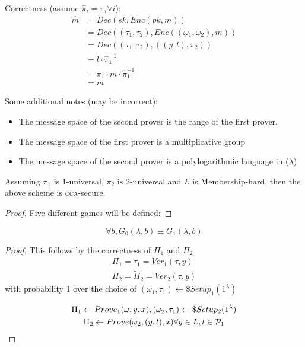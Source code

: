 Correctness (assume $\hat{\pi}_i = \pi_i \forall i$):
\begin{align*}
    \hat{m} &= Dec(sk, Enc(pk, m)) \\
    &= Dec((\tau_1, \tau_2), Enc((\omega_1, \omega_2), m)) \\
    &= Dec((\tau_1, \tau_2), ((y, l), \pi_2)) \\
    &= l \cdot \hat{\pi}_1^{-1} \\
    &= \pi_1 \cdot m \cdot \hat{\pi}_1^{-1} \\
    &= m
\end{align*}

Some additional notes (may be incorrect):
\begin{itemize}
    \item The message space of the second prover is the range of the first prover.
    \item The message space of the first prover is a multiplicative group
    \item The message space of the second prover is a polylogarithmic language in ($\lambda$)
\end{itemize}

\begin{theorem} 
    Assuming $\pi_1$ is 1-universal, $\pi_2$ is 2-universal and $L$
    is Membership-hard, then the above scheme is \textsc{cca}-secure.
\end{theorem}

\begin{proof}
 Five different games will be defined:

\end{proof}


\begin{lemma}
    \[
        \forall b, G_{0}(\lambda, b) \equiv G_{1}(\lambda, b)   
    \]
\end{lemma}

\begin{proof}
    This follows by the correctness of $\Pi_{1}$ and $\Pi_{2}$
    \begin{gather*}
        \Pi_{1}=\tau_{1}=Ver_{1}(\tau, y)\\
         \Pi_{2}= \tilde{\Pi}_{2}=Ver_{2}(\tau, y)
    \end{gather*}
    with probability 1 over the choice of $(\omega_{1}, \tau_{1}) \leftarrow\$
    Setup_{1}(1^{\lambda})$
    
    \begin{gather*}
        \Pi_{1} \leftarrow Prove_{1}(\omega, y, x), (\omega_{2},
        \tau_{1})\leftarrow\$ Setup_{2} (1^{\lambda})\\
        \Pi_{2} \leftarrow Prove(\omega_{2}, (y, l), x) \forall y \in L , l \in
        \P_{1}
    \end{gather*}
    
\end{proof}

